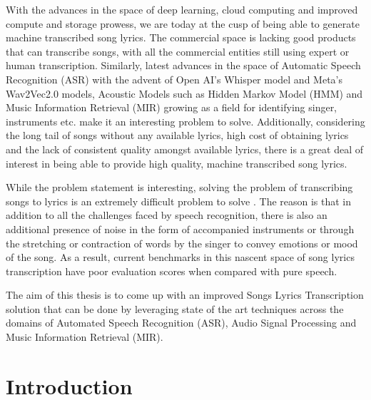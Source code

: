 With the advances in the space of deep learning, cloud computing and improved compute and storage prowess, we are today at the cusp of being able to generate machine transcribed song lyrics. The commercial space is lacking good products that can transcribe songs, with all the commercial entities still using expert or human transcription. Similarly, latest advances in the space of Automatic Speech Recognition (ASR) with the advent of Open AI's Whisper model and Meta's Wav2Vec2.0 models, Acoustic Models such as Hidden Markov Model (HMM) and Music Information Retrieval (MIR) growing as a field for identifying singer, instruments etc. make it an interesting problem to solve. Additionally, considering the long tail of songs without any available lyrics, high cost of obtaining lyrics and the lack of consistent quality amongst available lyrics, there is a great deal of interest in being able to provide high quality, machine transcribed song lyrics.

While the problem statement is interesting, solving the problem of transcribing songs to lyrics is an extremely difficult problem to solve \cite{gu2022mm} . The reason is that in addition to all the challenges faced by speech recognition, there is also an additional presence of noise in the form of accompanied instruments or through the stretching or contraction of words by the singer to convey emotions or mood of the song. As a result, current benchmarks in this nascent space of song lyrics transcription have poor evaluation scores when compared with pure speech.

The aim of this thesis is to come up with an improved Songs Lyrics Transcription solution that can be done by leveraging  state of the art techniques across the domains of Automated Speech Recognition (ASR), Audio Signal Processing and Music Information Retrieval (MIR).

\section{Introduction}
\label{sec:introduction}

